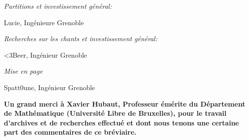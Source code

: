 \documentclass[a5paper,twoside,openright]{article} %
\begin{document}
\textit{Partitions et investissement général:}
\begin{addmargin}[1em]{2em}%
Lucie{\color{falGrey!60!black}, Ingénieure Grenoble}\\
\end{addmargin}

\textit{Recherches sur les chants et investissement général:}
\begin{addmargin}[1em]{2em}%
<3Beer{\color{falGrey!60!black}, Ingénieur Grenoble}\\
\end{addmargin}

\textit{Mise en page}
\begin{addmargin}[1em]{2em}%
Spatt0une{\color{falGrey!60!black}, Ingénieur Grenoble}\\
\end{addmargin}

\textbf{Un grand merci à Xavier Hubaut, Professeur émérite du Département de Mathématique (Université Libre de Bruxelles), pour le travail d'archives et de recherches effectué et dont nous tenons une certaine part des commentaires de ce bréviaire.}
\end{document}
